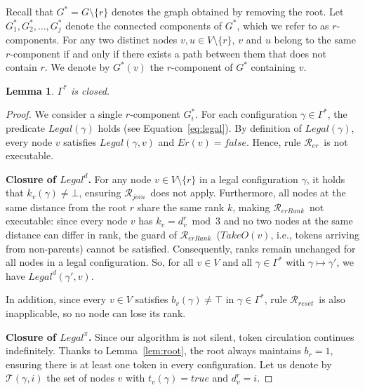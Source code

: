 \documentclass[a4paper, 12pt]{article}
\newtheorem{lemma}[theorem]{Lemma}
\newcommand{\rk}{k}
\newcommand{\Rer}{$\mathscr{R}_{er}$}
\newcommand{\Rreset}{$\mathscr{R}_{reset}$}
\newcommand{\RerRank}{$\mathscr{R}_{erRank}$}
\newcommand{\Rjoin}{$\mathscr{R}_{join}$}
\begin{document}
Recall that $G^* = G \setminus \{r\}$ denotes the graph obtained by 
removing the root. Let $G^*_1, G^*_2, \ldots, G^*_j$ denote the 
connected components of $G^*$, which we refer to as $r$-components. 
For any two distinct nodes $v, u \in V \setminus \{r\}$, $v$ and $u$ 
belong to the same $r$-component if and only if there exists a path 
between them that does not contain $r$. We denote by $G^*(v)$ the 
$r$-component of $G^*$ containing $v$.

\begin{lemma}
\label{lem:clos}
$\Gamma^*$ is closed.
\end{lemma}

\begin{proof}
We consider a single $r$-component $G^*_i$. For each configuration 
$\gamma \in \Gamma^*$, the predicate $Legal(\gamma)$ holds 
(see Equation~\ref{eq:legal}). By definition of $Legal(\gamma)$, every 
node $v$ satisfies $Legal(\gamma,v)$ and $Er(v) = \mathit{false}$. 
Hence, rule \Rer\ is not executable.

\medskip
\noindent\textbf{Closure of $Legal^d$.}
For any node $v \in V \setminus \{r\}$ in a legal configuration 
$\gamma$, it holds that $\rk_v(\gamma) \neq \bot$, ensuring \Rjoin\ 
does not apply. Furthermore, all nodes at the same distance from the 
root $r$ share the same rank $\rk$, making \RerRank\ not executable: 
since every node $v$ has $\rk_v = d^r_v \bmod 3$ and no two nodes 
at the same distance can differ in rank, the guard of \RerRank\ 
($\mathit{TakeO}(v)$, i.e., tokens arriving from non-parents) cannot 
be satisfied. Consequently, ranks remain unchanged for all nodes in 
a legal configuration. So, for all $v \in V$ and all $\gamma \in 
\Gamma^*$ with $\gamma \mapsto \gamma'$, we have 
$Legal^d(\gamma', v)$.

In addition, since every $v \in V$ satisfies $b_v(\gamma) \neq \top$ 
in $\gamma \in \Gamma^*$, rule \Rreset\ is also inapplicable, so no 
node can lose its rank.

\medskip
\noindent\textbf{Closure of $Legal^\pi$.}
Since our algorithm is not silent, token circulation continues 
indefinitely. Thanks to Lemma~\ref{lem:root}, the root always 
maintains $b_r = 1$, ensuring there is at least one token in every 
configuration. Let us denote by $\mathcal{T}(\gamma, i)$ the set of 
nodes $v$ with $t_v(\gamma) = \mathit{true}$ and $d^r_v = i$.


\end{proof}
\end{document}

